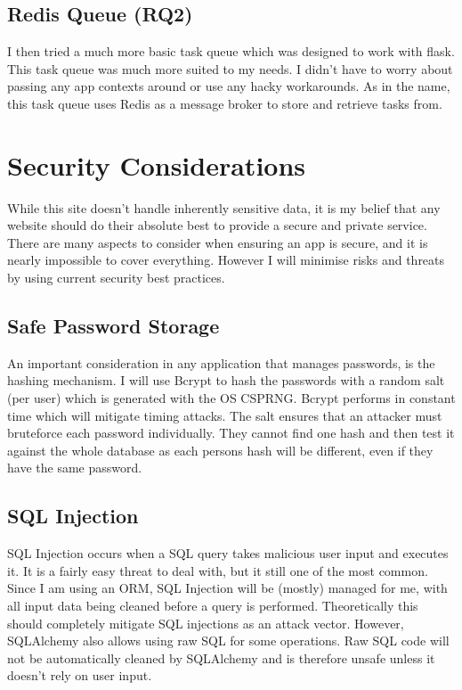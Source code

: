 \documentclass[a4paper,oneside,12pt,draft]{report}
\begin{document}
	\subsection{Redis Queue (RQ2)}
	I then tried a much more basic task queue which was designed to work with flask. This task queue was much more suited to my needs.
	I didn't have to worry about passing any app contexts around or use any hacky workarounds. As in the name, this task queue uses Redis as a message broker to store and retrieve tasks from.

	\section{Security Considerations}
	While this site doesn’t handle inherently sensitive data, it is my belief that any website should do their absolute best to provide a secure and private service. There are many aspects to consider when ensuring an app is secure, and it is nearly impossible to cover everything. However I will minimise risks and threats by using current security best practices.

	\subsection{Safe Password Storage}
	An important consideration in any application that manages passwords, is the hashing mechanism. I will use Bcrypt to hash the passwords with a random salt (per user) which is generated with the OS CSPRNG. Bcrypt performs in constant time which will mitigate timing attacks. The salt ensures that an attacker must bruteforce each password individually. They cannot find one hash and then test it against the whole database as each persons hash will be different, even if they have the same password.

	\subsection{SQL Injection}
	SQL Injection occurs when a SQL query takes malicious user input and executes it. It is a fairly easy threat to deal with, but it still one of the most common. Since I am using an ORM, SQL Injection will be (mostly) managed for me, with all input data being cleaned before a query is performed. Theoretically this should completely mitigate SQL injections as an attack vector. However, SQLAlchemy also allows using raw SQL for some operations. Raw SQL code will not be automatically cleaned by SQLAlchemy and is therefore unsafe unless it doesn’t rely on user input.
\end{document}
